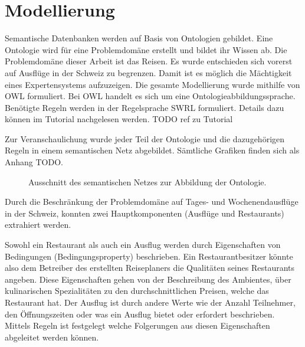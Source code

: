 \section{Modellierung}
\label{sec:loesung_modellierung}

Semantische Datenbanken werden auf Basis von Ontologien gebildet. Eine Ontologie wird für eine Problemdomäne erstellt und bildet ihr Wissen ab. Die Problemdomäne dieser Arbeit ist das Reisen. Es wurde entschieden sich vorerst auf Ausflüge in der Schweiz zu begrenzen. Damit ist es möglich die Mächtigkeit eines Expertensystems aufzuzeigen. Die gesamte Modellierung wurde mithilfe von OWL formuliert. Bei OWL handelt es sich um eine Ontologieabbildungssprache. Benötigte Regeln werden in der Regelsprache SWRL formuliert. Details dazu können im Tutorial nachgelesen werden. TODO ref zu Tutorial

Zur Veranschaulichung wurde jeder Teil der Ontologie und die dazugehörigen Regeln in einem semantischen Netz abgebildet. Sämtliche Grafiken finden sich als Anhang TODO.

\begin{figure}[H]
\centering {}
\caption{Ausschnitt des semantischen Netzes zur Abbildung der Ontologie.\label{fig:semNetzLoesung}\protect\footnotemark}
\end{figure}


Durch die Beschränkung der Problemdomäne auf Tages- und Wochenendausflüge in der Schweiz, konnten zwei Hauptkomponenten (Ausflüge und Restaurants) extrahiert werden.

Sowohl ein Restaurant als auch ein Ausflug werden durch Eigenschaften von Bedingungen (Bedingungsproperty) beschrieben. Ein Restaurantbesitzer könnte also dem Betreiber des erstellten Reiseplaners die Qualitäten seines Restaurants angeben. Diese Eigenschaften gehen von der Beschreibung des Ambientes, über kulinarischen Spezialitäten zu den durchschnittlichen Preisen, welche das Restaurant hat. Der Ausflug ist durch andere Werte wie der Anzahl Teilnehmer, den Öffnungszeiten oder was ein Ausflug bietet oder erfordert beschrieben.
Mittels Regeln ist festgelegt welche Folgerungen aus diesen Eigenschaften abgeleitet werden können.

